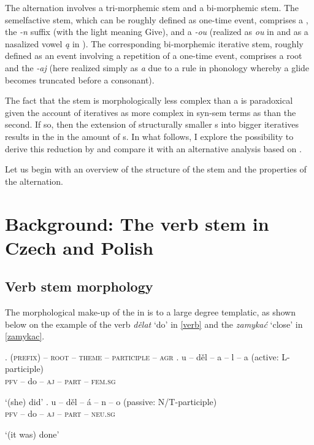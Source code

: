 The alternation involves a tri-mor\-phe\-mic   stem and a bi-morphemic  stem. The semelfactive stem, which can be roughly defined as one-time event, comprises a , the \textit{-n} suffix (with the light  meaning Give),  and a  \textit{-ou} (realized as \textit{ou} in  and as a nasalized vowel \textit{\k{a}} in ). The corresponding bi-morphemic iterative stem, roughly defined as an event involving a repetition of a one-time event, comprises a root and the  \textit{-aj} (here realized simply as \textit{a} due to a rule in  phonology whereby a glide becomes truncated  before a consonant).
\par
The fact that the  stem is morphologically less complex than a  is paradoxical given the account of iteratives as more complex in syn-sem terms as than the second. If so, then the extension of structurally smaller s into bigger iteratives results in the  in the amount of s. In what follows, I explore the possibility to derive this  reduction by  and compare it with an alternative analysis based on . 
\par
Let us begin with an overview of the structure of the   stem and the properties of the  alternation. 

\section{Background: The verb stem in Czech and Polish}

\subsection{Verb stem morphology}

The morphological make-up of the  in  is to a large degree templatic, as shown below on the example of the  verb \textit{d\v elat} `do' in \ref{verb} and the   \textit{zamyka\'c} `close' in \ref{zamykac}.

\ex.\label{verb}	
\textsc{(prefix) -- root -- theme -- participle -- agr} 
\ag.
u -- d\v el -- a -- l -- a (active: L-participle)\label{1a} \\
\textsc{pfv} -- do -- \textsc{aj} -- \textsc{part} -- \textsc{fem.sg} \\
\strut `(she) did' 
\bg. u -- d\v el -- \'a -- n -- o (passive: N/T-participle)\label{1b}\\
\textsc{pfv} -- do -- \textsc{aj} -- \textsc{part} -- \textsc{neu.sg} \\
\strut `(it was) done' 

